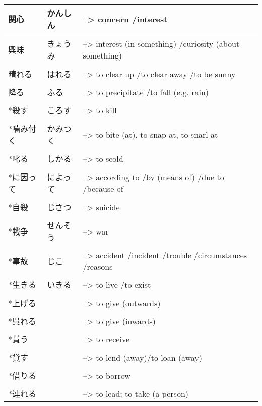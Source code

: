 \documentclass{article}
\begin{document}
\begin{tabular}{ p{3cm} | l l }
関心&かんしん&--> concern /interest \\ \hline\\[-1em]
興味&きょうみ&--> interest (in something) /curiosity (about something) \\ \hline\\[-1em]
晴れる&はれる&--> to clear up /to clear away /to be sunny \\ \hline\\[-1em]
降る&ふる&--> to precipitate /to fall (e.g. rain) \\ \hline\\[-1em]
*殺す&ころす&--> to kill \\ \hline\\[-1em]
*噛み付く&かみつく&--> to bite (at), to snap at, to snarl at \\ \hline\\[-1em]
*叱る&しかる&--> to scold \\ \hline\\[-1em]
*に因って&によって&--> according to /by (means of) /due to /because of \\ \hline\\[-1em]
*自殺&じさつ&--> suicide \\ \hline\\[-1em]
*戦争&せんそう&--> war \\ \hline\\[-1em]
*事故&じこ&--> accident /incident /trouble /circumstances /reasons \\ \hline\\[-1em]
*生きる&いきる&--> to live /to exist \\ \hline\\[-1em]
*上げる&&--> to give (outwards) \\ \hline\\[-1em]
*呉れる&&--> to give (inwards) \\ \hline\\[-1em]
*貰う&&--> to receive \\ \hline\\[-1em]
*貸す&&--> to lend (away)/to loan (away) \\ \hline\\[-1em]
*借りる&&--> to borrow \\ \hline\\[-1em]
*連れる&&--> to lead; to take (a person) %
\end{tabular}
\end{document}
